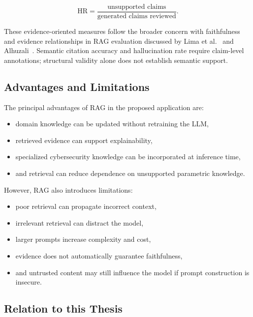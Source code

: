 \begin{equation}
\mathrm{HR} =
\frac{\text{unsupported claims}}
{\text{generated claims reviewed}}.
\end{equation}

These evidence-oriented measures follow the broader concern with
faithfulness and evidence relationships in RAG evaluation discussed by
Lima et al.~\cite{lima2024knowyourrag} and Alhuzali~\cite{alhuzali2025ragintel}.
Semantic citation accuracy and hallucination rate require claim-level
annotations; structural validity alone does not establish semantic
support.

\subsection{Advantages and
Limitations}\label{advantages-and-limitations}

The principal advantages of RAG in the proposed application are:

\begin{itemize}
\tightlist
\item
  domain knowledge can be updated without retraining the LLM,
\item
  retrieved evidence can support explainability,
\item
  specialized cybersecurity knowledge can be incorporated at inference
  time,
\item
  and retrieval can reduce dependence on unsupported parametric
  knowledge.
\end{itemize}

However, RAG also introduces limitations:

\begin{itemize}
\tightlist
\item
  poor retrieval can propagate incorrect context,
\item
  irrelevant retrieval can distract the model,
\item
  larger prompts increase complexity and cost,
\item
  evidence does not automatically guarantee faithfulness,
\item
  and untrusted content may still influence the model if prompt
  construction is insecure.
\end{itemize}

\subsection{Relation to this Thesis}\label{relation-to-this-thesis}

